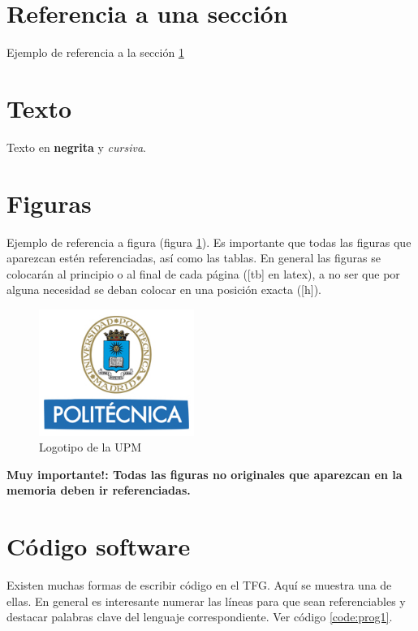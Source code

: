 \section{Referencia a una sección}
\label{sec:refsec}

Ejemplo de referencia a la sección \ref{sec:refsec}

\section{Texto}

Texto en \textbf{negrita} y \textit{cursiva}.

\section{Figuras}

Ejemplo de referencia a figura (figura \ref{fig:logo_upm}). Es importante que todas las figuras que aparezcan estén referenciadas, así como las tablas. En general las figuras se colocarán al principio o al final de cada página ([tb] en latex), a no ser que por alguna necesidad se deban colocar en una posición exacta ([h]).

\begin{figure}[tb]
\centering
\includegraphics[width=0.45\textwidth]{figures/Logo_UPM.jpg}   
\caption{Logotipo de la UPM}
\label{fig:logo_upm}
\end{figure}

\textbf{Muy importante!: Todas las figuras no originales que aparezcan en la memoria deben ir referenciadas.}


\section{Código software}

Existen muchas formas de escribir código en el TFG. Aquí se muestra una de ellas. En general es interesante numerar las líneas para que sean referenciables y destacar palabras clave del lenguaje correspondiente. Ver código \ref{code:prog1}.

